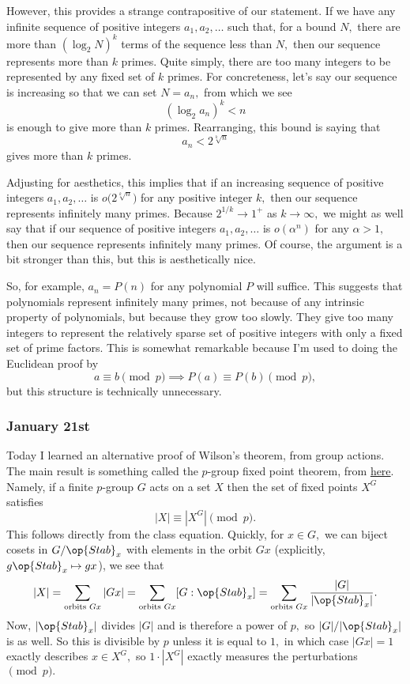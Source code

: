 However, this provides a strange contrapositive of our statement. If we have any infinite sequence of positive integers $a_1,a_2,\ldots$ such that, for a bound $N,$ there are more than $(\log_2N)^k$ terms of the sequence less than $N,$ then our sequence represents more than $k$ primes. Quite simply, there are too many integers to be represented by any fixed set of $k$ primes. For concreteness, let's say our sequence is increasing so that we can set $N=a_n,$ from which we see
\[(\log_2a_n)^k<n\]
is enough to give more than $k$ primes. Rearranging, this bound is saying that
\[a_n<2^{\sqrt[k]n}\]
gives more than $k$ primes.

Adjusting for aesthetics, this implies that if an increasing sequence of positive integers $a_1,a_2,\ldots$ is $o\big(2^{\sqrt[k]n}\big)$ for any positive integer $k,$ then our sequence represents infinitely many primes. Because $2^{1/k}\to1^+$ as $k\to\infty,$ we might as well say that if our sequence of positive integers $a_1,a_2,\ldots$ is $o\left(\alpha^n\right)$ for any $\alpha>1,$ then our sequence represents infinitely many primes. Of course, the argument is a bit stronger than this, but this is aesthetically nice.

So, for example, $a_n=P(n)$ for any polynomial $P$ will suffice. This suggests that polynomials represent infinitely many primes, not because of any intrinsic property of polynomials, but because they grow too slowly. They give too many integers to represent the relatively sparse set of positive integers with only a fixed set of prime factors. This is somewhat remarkable because I'm used to doing the Euclidean proof by
\[a\equiv b\pmod p\implies P(a)\equiv P(b)\pmod p,\]
but this structure is technically unnecessary.

\subsubsection{January 21st}
Today I learned an alternative proof of Wilson's theorem, from group actions. The main result is something called the $p$-group fixed point theorem, from \href{https://qchu.wordpress.com/2013/07/09/the-p-group-fixed-point-theorem/}{here}. Namely, if a finite $p$-group $G$ acts on a set $X$ then the set of fixed points $X^G$ satisfies
\[|X|\equiv\left|X^G\right|\pmod p.\]
This follows directly from the class equation. Quickly, for $x\in G,$ we can biject cosets in $G/\op{Stab}_x$ with elements in the orbit $Gx$ (explicitly, $g\op{Stab}_x\mapsto gx$), we see that
\[|X|=\sum_{\text{orbits }Gx}|Gx|=\sum_{\text{orbits }Gx}[G:\op{Stab}_x]=\sum_{\text{orbits }Gx}\frac{|G|}{|\op{Stab}_x|}.\]
Now, $|\op{Stab}_x|$ divides $|G|$ and is therefore a power of $p,$ so $|G|/|\op{Stab}_x|$ is as well. So this is divisible by $p$ unless it is equal to $1,$ in which case $|Gx|=1$ exactly describes $x\in X^G,$ so $1\cdot\left|X^G\right|$ exactly measures the perturbations$\pmod p.$

